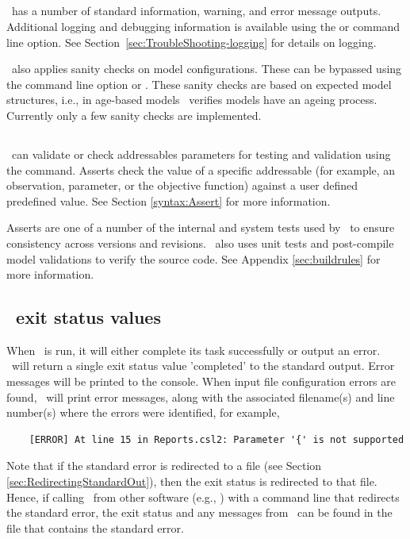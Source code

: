 \subsection{ \label{sec:LogandVerify} }

\CNAME\ has a  number of standard information, warning, and error message outputs. Additional logging and debugging information is available using the  or  command line option. See Section~\ref{sec:TroubleShooting-logging} for details on logging. 

\CNAME\ also applies sanity checks on model configurations. These can be bypassed using the command line option  or . These sanity checks are based on expected model structures, i.e., in age-based models \CNAME\ verifies models have an ageing process. Currently only a few sanity checks are implemented.

\subsection{}\label{sec:Assert}

\CNAME\ can validate or check addressables parameters for testing and validation using the  command. Asserts check the value of a specific addressable (for example, an observation, parameter, or the objective function) against a user defined predefined value. See Section \ref{syntax:Assert} for more information.

Asserts are one of a number of the internal and system tests used by \CNAME\ to ensure consistency across versions and revisions. \CNAME\ also uses unit tests and post-compile model validations to verify the source code. See Appendix \ref{sec:buildrules} for more information. 


\subsection{\CNAME\ exit status values}

When \CNAME\ is run, it will either complete its task successfully or output an error. \CNAME\ will return a single exit status value 'completed' to the standard output. Error messages will be printed to the console. When input file configuration errors are found, \CNAME\ will print error messages, along with the associated filename(s) and line number(s) where the errors were identified, for example,

{\small{\begin{verbatim}
	[ERROR] At line 15 in Reports.csl2: Parameter '{' is not supported
\end{verbatim}}}

Note that if the standard error is redirected to a file (see Section \ref{sec:RedirectingStandardOut}), then the exit status is  redirected to that file. Hence, if calling \CNAME\ from other software (e.g., \R) with a command line that redirects the standard error, the exit status and any messages from \CNAME\ can be found in the file that contains the standard error.

